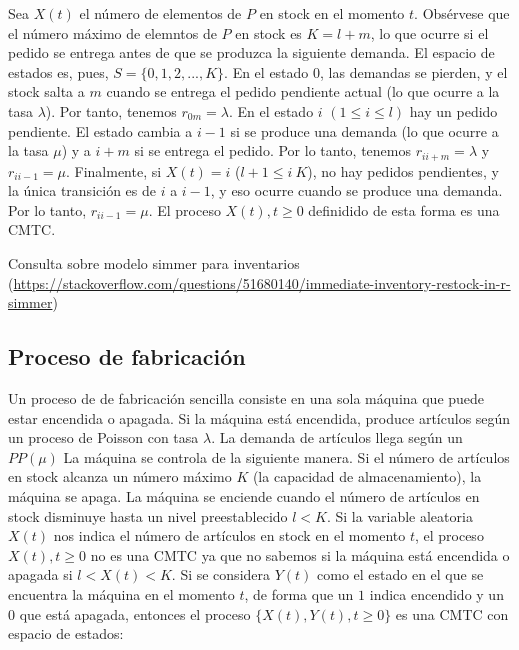 \documentclass[
]{book}
\theoremstyle{definition}
\theoremstyle{definition}
\theoremstyle{definition}
\theoremstyle{definition}
\theoremstyle{remark}
\begin{document}
Sea \(X(t)\) el número de elementos de \(P\) en stock en el momento \(t\). Obsérvese que el número máximo de elemntos de \(P\) en stock es \(K = l + m\), lo que ocurre si el pedido se entrega antes de que se produzca la siguiente demanda. El espacio de estados es, pues, \(S = \{0, 1, 2,...,K\}\). En el estado \(0\), las demandas se pierden, y el stock salta a \(m\) cuando se entrega el pedido pendiente actual (lo que ocurre a la tasa \(\lambda\)). Por tanto, tenemos \(r_{0m} = \lambda\). En el estado \(i\) \((1 \leq i \leq l)\) hay un pedido pendiente. El estado cambia a \(i-1\) si se produce una demanda (lo que ocurre a la tasa \(\mu\)) y a \(i + m\) si se entrega el pedido. Por lo tanto, tenemos \(r_{i i+m} = \lambda\) y \(r_{i i-1} = \mu\). Finalmente, si \(X(t) = i\) (\(l + 1 \leq i \ K\)), no hay pedidos pendientes, y la única transición es de \(i\) a \(i- 1\), y eso ocurre cuando se produce una demanda. Por lo tanto, \(r_{i i-1} = \mu\). El proceso \(X(t), t \geq 0\) definidido de esta forma es una CMTC.

Consulta sobre modelo simmer para inventarios (\url{https://stackoverflow.com/questions/51680140/immediate-inventory-restock-in-r-simmer})

\hypertarget{proceso-de-fabricaciuxf3n}{%
\subsection{Proceso de fabricación}\label{proceso-de-fabricaciuxf3n}}

Un proceso de de fabricación sencilla consiste en una sola máquina que puede estar encendida o apagada. Si la máquina está encendida, produce artículos según un proceso de Poisson con tasa \(\lambda\). La demanda de artículos llega según un \(PP(\mu)\) La máquina se controla de la siguiente manera. Si el número de artículos en stock alcanza un número máximo \(K\) (la capacidad de almacenamiento), la máquina se apaga. La máquina se enciende cuando el número de artículos en stock disminuye hasta un nivel preestablecido \(l < K\). Si la variable aleatoria \(X(t)\) nos indica el número de artículos en stock en el momento \(t\), el proceso \(X(t), t \geq 0\) no es una CMTC ya que no sabemos si la máquina está encendida o apagada si \(l < X(t) < K\). Si se considera \(Y(t)\) como el estado en el que se encuentra la máquina en el momento \(t\), de forma que un \(1\) indica encendido y un \(0\) que está apagada, entonces el proceso \(\{X(t), Y(t), t\geq 0\}\) es una CMTC con espacio de estados:
\end{document}
